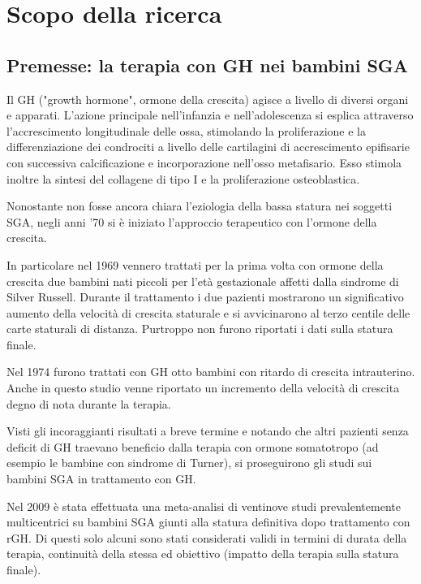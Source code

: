  \chapter{Scopo della ricerca}

\section{Premesse: la terapia con GH nei bambini SGA}


Il GH ("growth hormone", ormone della crescita) agisce a livello di diversi organi e apparati.
L'azione principale nell'infanzia e nell'adolescenza si esplica attraverso l'accrescimento
longitudinale delle ossa, stimolando la proliferazione e la differenziazione dei condrociti
a livello delle cartilagini di accrescimento epifisarie con successiva calcificazione
e incorporazione nell'osso metafisario. Esso stimola inoltre la sintesi del collagene 
di tipo I e la proliferazione osteoblastica.\cite{sga}


Nonostante non fosse ancora chiara l'eziologia della bassa statura nei soggetti SGA,
negli anni '70 si è iniziato l'approccio terapeutico con l'ormone della crescita.

In particolare nel 1969 vennero trattati per la prima volta con ormone della crescita  due bambini nati piccoli per l'età gestazionale affetti dalla sindrome di Silver Russell. Durante il trattamento i due pazienti mostrarono un significativo aumento della velocità di crescita staturale e si avvicinarono al terzo centile delle carte staturali di distanza. Purtroppo non furono riportati i dati sulla statura finale\cite{tanner1969low}.

Nel 1974 furono trattati con GH otto bambini con ritardo di crescita intrauterino. Anche in questo studio venne riportato un incremento della velocità di crescita degno di nota durante la terapia\cite{lee1974growth}.%


Visti gli incoraggianti risultati a breve termine e notando che altri pazienti senza deficit di GH traevano beneficio dalla terapia con ormone somatotropo (ad esempio le bambine con sindrome di Turner\cite{betts1999decade}),
si proseguirono gli studi sui bambini SGA in trattamento con GH.


Nel 2009 è stata effettuata una meta-analisi di ventinove studi prevalentemente multicentrici su bambini SGA giunti alla statura definitiva dopo trattamento con rGH. Di questi solo alcuni sono stati considerati validi in termini di durata della terapia, continuità della stessa ed obiettivo (impatto della terapia sulla statura finale)\cite{maiorana2009impact}.

